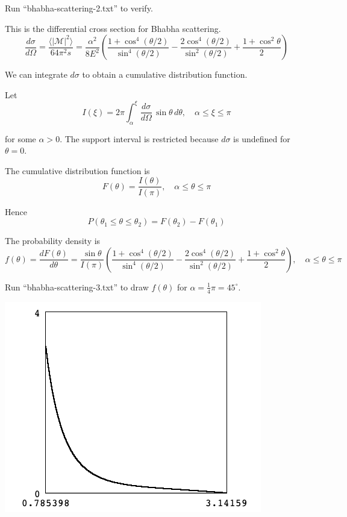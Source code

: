 \documentclass[12pt]{article}
\begin{document}
\noindent
Run ``bhabha-scattering-2.txt'' to verify.

\newpage
\noindent
This is the differential cross section for Bhabha scattering.
\begin{equation*}
\frac{d\sigma}{d\Omega}
=\frac{\langle|\mathcal{M}|^2\rangle}{64\pi^2s}
=\frac{\alpha^2}{8E^2}
\left(
\frac{1+\cos^4(\theta/2)}{\sin^4(\theta/2)}
-\frac{2\cos^4(\theta/2)}{\sin^2(\theta/2)}
+\frac{1+\cos^2\theta}{2}
\right)
\end{equation*}

\noindent
We can integrate $d\sigma$ to obtain a cumulative distribution function.

\bigskip
\noindent
Let
\begin{equation*}
I(\xi)=2\pi\int_\alpha^\xi\frac{d\sigma}{d\Omega}\,\sin\theta\,d\theta,
\quad\alpha\le\xi\le\pi
\end{equation*}

\noindent
for some $\alpha>0$.
The support interval is restricted because $d\sigma$ is undefined for $\theta=0$.

\bigskip
\noindent
The cumulative distribution function is
\begin{equation*}
F(\theta)=\frac{I(\theta)}{I(\pi)},
\quad\alpha\le\theta\le\pi
\end{equation*}

\noindent
Hence
\begin{equation*}
P(\theta_1\le\theta\le\theta_2)=F(\theta_2)-F(\theta_1)
\end{equation*}

\noindent
The probability density is
\begin{equation*}
f(\theta)=\frac{dF(\theta)}{d\theta}
=\frac{\sin\theta}{I(\pi)}
\left(
\frac{1+\cos^4(\theta/2)}{\sin^4(\theta/2)}
-\frac{2\cos^4(\theta/2)}{\sin^2(\theta/2)}
+\frac{1+\cos^2\theta}{2}
\right),
\quad\alpha\le\theta\le\pi
\end{equation*}

\noindent
Run ``bhabha-scattering-3.txt'' to draw $f(\theta)$ for $\alpha=\tfrac{1}{4}\pi=45^\circ$.

\begin{center}
\includegraphics[scale=0.5]{bhabha-scattering-ss1.png}
\end{center}
\end{document}
